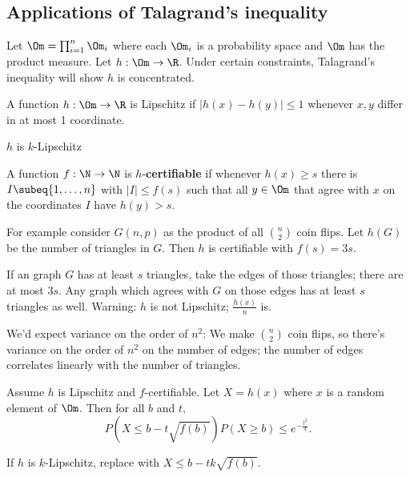 
\subsection{Applications of Talagrand's inequality}
Let $\Om=\prod_{i=1}^n\Om_i$ where each $\Om_i$ is a probability space and $\Om$ has the product measure. Let $h:\Om\to \R$. Under certain constraints, Talagrand's inequality will show $h$ is concentrated.

\begin{df}
A function $h:\Om\to \R$ is Lipschitz if $|h(x)-h(y)|\le 1$ whenever $x,y$ differ in at most 1 coordinate.

$h$ is $k$-Lipschitz
\end{df}
\begin{df}
A function $f:\N\to \N$ is $h$-\textbf{certifiable} if whenever $h(x)\ge s$ there is $I\subeq \{1,\ldots, n\}$ with $|I|\le f(s)$ such that all $y\in \Om$ that agree with $x$ on the coordinates $I$ have $h(y)>s$.
\end{df}
\begin{ex}
For example consider $G(n,p)$ as the product of all $\binom n2$ coin flips. Let $h(G)$ be the number of triangles in $G$. Then $h$ is certifiable with $f(s)=3s$.

If an graph $G$ has at least $s$ triangles, take the edges of those triangles; there are at most $3s$. Any graph which agrees with $G$ on those edges has at least $s$ triangles as well. Warning: $h$ is not Lipschitz; $\frac{h(x)}{n}$ is.

We'd expect variance on the order of $n^2$: We make $\binom n2$ coin flips, so there's variance on the order of $n^2$ on the number of edges; the number of edges correlates linearly with the number of triangles.
\end{ex}
\begin{thm}\label{talacon}
Assume $h$ is Lipschitz and $f$-certifiable. Let $X=h(x)$ where $x$ is a random element of $\Om$. 
Then for all $b$ and $t$,
\[
P(X\le b-t\sqrt{f(b)})P(X\ge b)\le e^{-\frac{t^2}{4}}.
\]
\end{thm}
If $h$ is $k$-Lipschitz, replace with $X\le b-tk\sqrt{f(b)}$.
